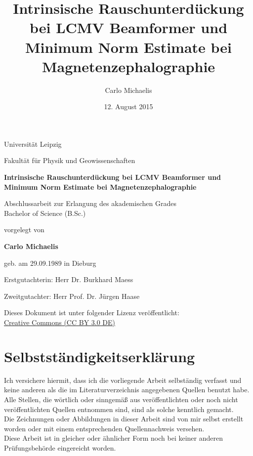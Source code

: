\documentclass[doc,a4paper,12pt]{apa6}
\title{Intrinsische Rauschunterdückung bei LCMV Beamformer und Minimum Norm Estimate bei Magnetenzephalographie}
\author{Carlo Michaelis}
\date{12. August 2015}
\begin{document}

\thispagestyle{empty}

\begin{spacing}{1.1}
\begin{center}

\Large Universität Leipzig

\setlength{\parskip}{0.8em}
\normalsize Fakultät für Physik und Geowissenschaften

\setlength{\parskip}{6em}
\LARGE \textbf{Intrinsische Rauschunterdückung bei LCMV Beamformer und Minimum Norm Estimate bei Magnetenzephalographie}

\setlength{\parskip}{1.8em}
\normalsize Abschlussarbeit zur Erlangung des akademischen Grades\\ Bachelor of Science (B.Sc.)

\setlength{\parskip}{1.2em}
\normalsize vorgelegt von

\setlength{\parskip}{1.8em}
\Large \textbf{Carlo Michaelis}

\setlength{\parskip}{0.5em}
\normalsize geb. am 29.09.1989 in Dieburg

\setlength{\parskip}{3em}

Erstgutachterin: Herr Dr. Burkhard Maess

\setlength{\parskip}{0.3em}
Zweitgutachter: Herr Prof. Dr. Jürgen Haase

\vfill

Dieses Dokument ist unter folgender Lizenz veröffentlicht:\\ \href{http://creativecommons.org/licenses/by/3.0/de/}{Creative Commons (CC BY 3.0 DE)}

\end{center}
\end{spacing}
\newpage

\section*{Selbstständigkeitserklärung}

Ich versichere hiermit, dass ich die vorliegende Arbeit selbständig verfasst und keine
anderen als die im Literaturverzeichnis angegebenen Quellen benutzt habe.\\
Alle Stellen, die wörtlich oder sinngemäß aus veröffentlichten oder noch nicht veröffentlichten
Quellen entnommen sind, sind als solche kenntlich gemacht.\\
Die Zeichnungen oder Abbildungen in dieser Arbeit sind von mir selbst erstellt worden oder
mit einem entsprechenden Quellennachweis versehen.\\
Diese Arbeit ist in gleicher oder ähnlicher Form noch bei keiner anderen Prüfungsbehörde
eingereicht worden.
\end{document}
